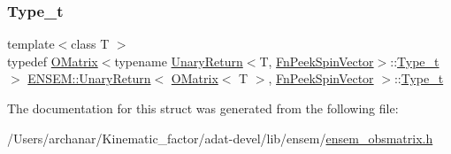 \subsubsection{\texorpdfstring{Type\_t}{Type\_t}\hspace{0.1cm}{\footnotesize\ttfamily [3/3]}}
{\footnotesize\ttfamily template$<$class T $>$ \\
typedef \mbox{\hyperlink{classENSEM_1_1OMatrix}{O\+Matrix}}$<$typename \mbox{\hyperlink{structENSEM_1_1UnaryReturn}{Unary\+Return}}$<$T, \mbox{\hyperlink{structENSEM_1_1FnPeekSpinVector}{Fn\+Peek\+Spin\+Vector}}$>$\+::\mbox{\hyperlink{structENSEM_1_1UnaryReturn_3_01OMatrix_3_01T_01_4_00_01FnPeekSpinVector_01_4_a995bd2c849af30377b0fa17937b63f19}{Type\+\_\+t}}$>$ \mbox{\hyperlink{structENSEM_1_1UnaryReturn}{E\+N\+S\+E\+M\+::\+Unary\+Return}}$<$ \mbox{\hyperlink{classENSEM_1_1OMatrix}{O\+Matrix}}$<$ T $>$, \mbox{\hyperlink{structENSEM_1_1FnPeekSpinVector}{Fn\+Peek\+Spin\+Vector}} $>$\+::\mbox{\hyperlink{structENSEM_1_1UnaryReturn_3_01OMatrix_3_01T_01_4_00_01FnPeekSpinVector_01_4_a995bd2c849af30377b0fa17937b63f19}{Type\+\_\+t}}}



The documentation for this struct was generated from the following file\+:\begin{DoxyCompactItemize}
\item 
/\+Users/archanar/\+Kinematic\+\_\+factor/adat-\/devel/lib/ensem/\mbox{\hyperlink{adat-devel_2lib_2ensem_2ensem__obsmatrix_8h}{ensem\+\_\+obsmatrix.\+h}}\end{DoxyCompactItemize}
